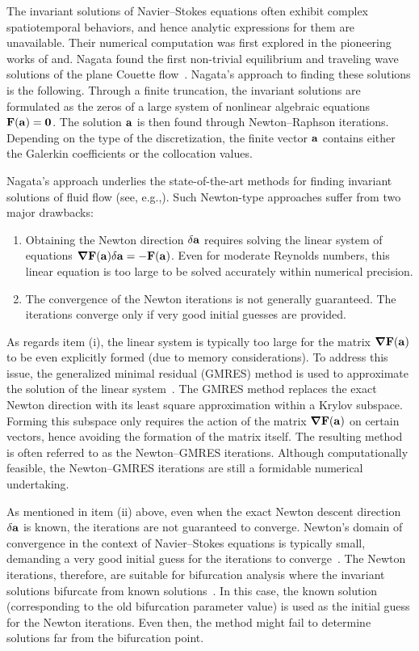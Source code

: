 \documentclass{jfm}
\begin{document}
The invariant solutions of Navier--Stokes equations often exhibit
complex spatiotemporal behaviors, and hence analytic expressions for them
are unavailable. Their numerical computation was first
explored in the pioneering works of and.
Nagata found the first non-trivial equilibrium and traveling wave solutions
of the plane Couette flow~\citep{N90,N97}.
Nagata's approach to finding these solutions is the following.
Through a finite truncation, the invariant solutions are formulated as the zeros of
a large system of nonlinear algebraic equations $\mathbf F(\mathbf a)=\mathbf 0$. The solution $\mathbf a$ is
then found through Newton--Raphson iterations. Depending on the type of the
discretization, the finite vector $\mathbf a$ contains either
the Galerkin coefficients or the collocation values.

Nagata's approach underlies the state-of-the-art methods for finding invariant solutions
of fluid flow
(see, e.g.,). Such Newton-type approaches suffer from two
major drawbacks:
\begin{enumerate}\renewcommand{\theenumi}{\roman{enumi}}
\item Obtaining the Newton direction $\delta\mathbf a$ requires solving the linear system of equations
$\mbox{\boldmath $\nabla$}\mathbf F(\mathbf a)\delta\mathbf a=-\mathbf F(\mathbf a)$.
Even for moderate Reynolds numbers, this linear equation
is too large to be solved accurately within numerical precision.
\item The convergence of the Newton iterations is not generally guaranteed. The iterations converge
only if very good initial guesses are provided.
\end{enumerate}

As regards item (i), the linear system is typically too large for the
matrix $\mbox{\boldmath $\nabla$}\mathbf F(\mathbf a)$ to be even
explicitly formed (due to memory considerations). To address this issue,
 the generalized minimal residual (GMRES) method is used to
approximate the solution of the linear system~\citep{gmres}. The GMRES method replaces the
exact Newton direction with its least square approximation within a Krylov subspace.
Forming this subspace only requires the action of the matrix $\mbox{\boldmath $\nabla$}\mathbf F(\mathbf a)$ on certain
vectors, hence avoiding the formation of the matrix itself.
The resulting method is often referred to as the Newton--GMRES iterations.
Although computationally feasible, the Newton--GMRES iterations are still
a formidable numerical undertaking.

As mentioned in item (ii) above, even when the exact Newton descent direction $\delta \mathbf a$
is known, the iterations are not guaranteed to converge. Newton's domain of convergence
in the context of Navier--Stokes equations is typically small,
demanding a very good initial guess for the iterations to converge~\citep{W97}. The Newton
iterations, therefore, are suitable
for bifurcation analysis where the invariant solutions bifurcate from known
solutions~\citep{Tuck00,W03,K12}. In this case, the known solution (corresponding to the
old bifurcation parameter value) is used as the initial guess for the Newton iterations.
Even then, the method might fail to determine solutions far from the bifurcation point.
\end{document}
